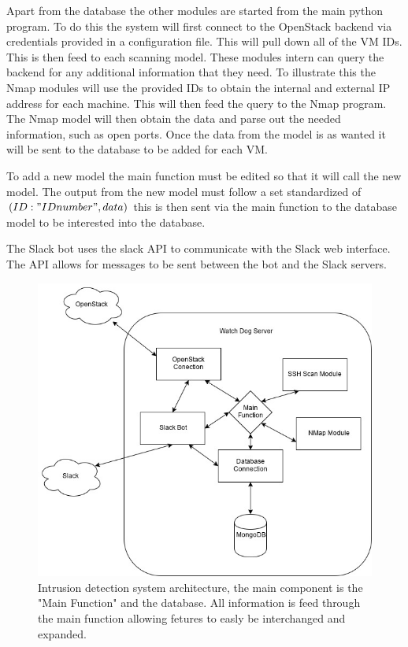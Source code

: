 \documentclass[12pt]{article}
\begin{document}
Apart from the database the other modules are started from the main python program. To do this the system will first connect to the OpenStack backend via credentials provided in a configuration file. This will pull down all of the VM IDs. This is then feed to each scanning model. These modules intern can query the backend for any additional information that they need. To illustrate this the Nmap modules will use the provided IDs to obtain the internal and external IP address for each machine. This will then feed the query to the Nmap program. The Nmap model will then obtain the data and parse out the needed information, such as open ports. Once the data from the model is as wanted it will be sent to the database to be added for each VM.

To add a new model the main function must be edited so that it will call the new model. The output from the new model must follow a set standardized of $(ID: "ID number", data)$ this is then sent via the main function to the database model to be interested into the database.

The Slack bot uses the slack API to communicate with the Slack web interface. The API allows for messages to be sent between the bot and the Slack servers.

\begin{figure}[ht]
    \includegraphics[scale=.5]{./pic/Arcitecture.png}
    \caption{Intrusion detection system architecture, the main component is the "Main Function" and the database. All information is feed through the main function allowing fetures to easly be interchanged and expanded.}
\end{figure}
\end{document}
